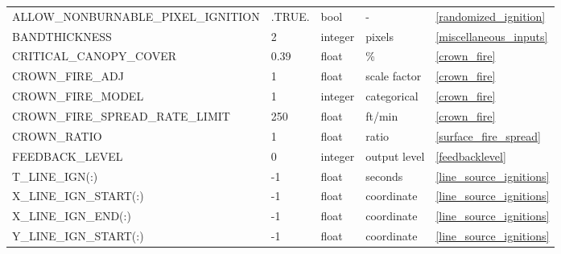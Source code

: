 \begin{landscape}
\begin{center}
\begin{longtable}{lllll}
\toprule
ALLOW\_NONBURNABLE\_PIXEL\_IGNITION          & .TRUE.                     & bool                   & -                                  & \ref{randomized_ignition}            \\
BANDTHICKNESS                                & 2                          & integer                & pixels                             & \ref{miscellaneous_inputs}           \\
CRITICAL\_CANOPY\_COVER                      & 0.39                       & float                  & \%                                 & \ref{crown_fire}                     \\
CROWN\_FIRE\_ADJ                             & 1                          & float                  & scale factor                       & \ref{crown_fire}                     \\
CROWN\_FIRE\_MODEL                           & 1                          & integer                & categorical                        & \ref{crown_fire}                     \\
CROWN\_FIRE\_SPREAD\_RATE\_LIMIT             & 250                        & float                  & ft/min                             & \ref{crown_fire}                     \\
CROWN\_RATIO                                 & 1                          & float                  & ratio                              & \ref{surface_fire_spread}            \\
FEEDBACK\_LEVEL                              & 0                          & integer                & output level                       & \ref{feedbacklevel}                  \\
T\_LINE\_IGN(:)                              & -1                         & float                  & seconds                            & \ref{line_source_ignitions}          \\
X\_LINE\_IGN\_START(:)                       & -1                         & float                  & coordinate                         & \ref{line_source_ignitions}          \\
X\_LINE\_IGN\_END(:)                         & -1                         & float                  & coordinate                         & \ref{line_source_ignitions}          \\
Y\_LINE\_IGN\_START(:)                       & -1                         & float                  & coordinate                         & \ref{line_source_ignitions}          \\

\end{longtable}
\end{center}
\end{landscape}
